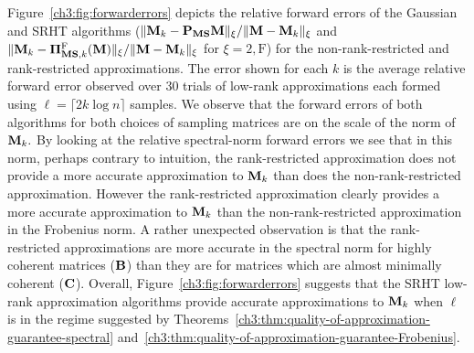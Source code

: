 Figure~\ref{ch3:fig:forwarderrors} depicts the relative forward errors of the
Gaussian and SRHT algorithms ($\mbox{}\|\mathbf{M}_k - \mathbf{P}_{\mathbf{M}\mathbf{S}} \mathbf{M}\|_{\xi}/\mbox{}\|\mathbf{M} - \mathbf{M}_k\|_{\xi}$ 
 and $\mbox{}\|\mathbf{M}_k - \boldsymbol{\Pi}_{\mathbf{M}\mathbf{S}, k}^{\mathrm{F}}(\mathbf{M})\|_{\xi}/\mbox{}\|\mathbf{M} - \mathbf{M}_k\|_{\xi}$ 
 for $\xi = 2, \mathrm{F}$) for the
non-rank-restricted and rank-restricted approximations. The error shown for each
$k$ is the average relative forward error observed over 30 trials of low-rank
approximations each formed using $\ell = \lceil 2 k \log n\rceil$ samples. We
observe that the forward errors of both algorithms for both choices of sampling
matrices are on the scale of the norm of $\mathbf{M}_k.$ By looking at the relative
spectral-norm forward errors we see that in this norm, perhaps contrary to
intuition, the rank-restricted approximation does not provide a more accurate
approximation to $\mathbf{M}_k$ than does the non-rank-restricted approximation.
However the rank-restricted approximation clearly provides a more accurate
approximation to $\mathbf{M}_k$ than the non-rank-restricted 
approximation in the
Frobenius norm. A rather
unexpected observation is that the rank-restricted approximations are more
accurate in the spectral norm for highly coherent matrices ($\mathbf{B}$) than they
are for matrices which are almost minimally coherent ($\mathbf{C}$). Overall,
Figure~\ref{ch3:fig:forwarderrors} suggests that the SRHT low-rank approximation
algorithms provide accurate approximations to $\mathbf{M}_k$ when $\ell$ is in the
regime suggested by Theorems~\ref{ch3:thm:quality-of-approximation-guarantee-spectral}
and~\ref{ch3:thm:quality-of-approximation-guarantee-Frobenius}.

